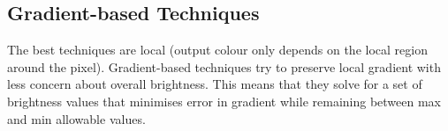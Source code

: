 \documentclass{article}
\begin{document}
\subsection{Gradient-based Techniques}
The best techniques are local (output colour only depends on the local region around the pixel).
Gradient-based techniques try to preserve local gradient with less concern about overall brightness.
This means that they solve for a set of brightness values that minimises error in gradient while remaining between max and min allowable values.
\end{document}
